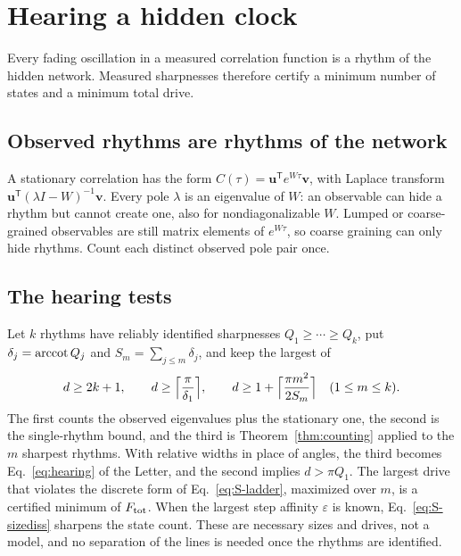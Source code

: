 \section{Hearing a hidden clock}\label{sec:inference}

Every fading oscillation in a measured correlation function is a rhythm of the hidden network. Measured sharpnesses therefore certify a minimum number of states and a minimum total drive.

\subsection{Observed rhythms are rhythms of the network}

A stationary correlation has the form $C(\tau)=\bm u^{\mathsf T}e^{W\tau}\bm v$, with Laplace transform $\bm u^{\mathsf T}(\lambda I-W)^{-1}\bm v$. Every pole $\lambda$ is an eigenvalue of $W$: an observable can hide a rhythm but cannot create one, also for nondiagonalizable $W$. Lumped or coarse-grained observables are still matrix elements of $e^{W\tau}$, so coarse graining can only hide rhythms. Count each distinct observed pole pair once.

\subsection{The hearing tests}

Let $k$ rhythms have reliably identified sharpnesses $Q_1\ge\cdots\ge Q_k$, put $\delta_j=\operatorname{arccot} Q_j$ and $S_m=\sum_{j\le m}\delta_j$, and keep the largest of
\begin{equation}
d\ge2k+1,\qquad d\ge\Bigl\lceil\frac{\pi}{\delta_1}\Bigr\rceil,\qquad d\ge1+\Bigl\lceil\frac{\pi m^2}{2S_m}\Bigr\rceil\quad(1\le m\le k).
\label{eq:S-tests}
\end{equation}
The first counts the observed eigenvalues plus the stationary one, the second is the single-rhythm bound, and the third is Theorem~\ref{thm:counting} applied to the $m$ sharpest rhythms. With relative widths in place of angles, the third becomes Eq.~\eqref{eq:hearing} of the Letter, and the second implies $d>\pi Q_1$. The largest drive that violates the discrete form of Eq.~\eqref{eq:S-ladder}, maximized over $m$, is a certified minimum of $F_{\mathrm{tot}}$. When the largest step affinity $\varepsilon$ is known, Eq.~\eqref{eq:S-sizediss} sharpens the state count. These are necessary sizes and drives, not a model, and no separation of the lines is needed once the rhythms are identified.

